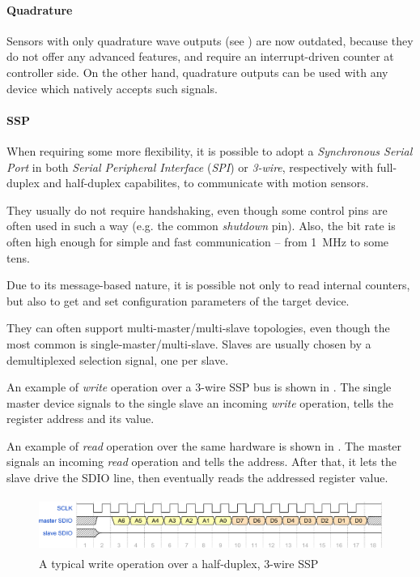 \documentclass[a4paper,10pt]{article}
\begin{document}
\begin{multicols}{2}
\paragraph{Quadrature}
Sensors with only quadrature wave outputs (see ) are now
outdated, because they do not offer any advanced features, and require an
interrupt-driven counter at controller side. On the other hand, quadrature
outputs can be used with any device which natively accepts such signals.


\paragraph{SSP}
When requiring some more flexibility, it is possible to adopt a
\emph{Synchronous Serial Port} in both \emph{Serial Peripheral Interface}
(\emph{SPI}) or \emph{3-wire}, respectively with full-duplex and half-duplex
capabilites, to communicate with motion sensors.

They usually do not require handshaking, even though some control pins are
often used in such a way (e.g. the common \emph{shutdown} pin). Also, the
bit rate is often high enough for simple and fast communication -- from
1~MHz to some tens.

Due to its message-based nature, it is possible not only to read internal
counters, but also to get and set configuration parameters of the target
device.

They can often support multi-master/multi-slave topologies, even though the
most common is single-master/multi-slave. Slaves are usually chosen by a
demultiplexed selection signal, one per slave.

An example of \emph{write} operation over a 3-wire SSP bus is shown in
. The single master device signals to the single slave
an incoming \emph{write} operation, tells the register address and its value.

An example of \emph{read} operation over the same hardware is shown in
. The master signals an incoming \emph{read} operation
and tells the address. After that, it lets the slave drive the SDIO line,
then eventually reads the addressed register value.

\begin{figure}[t]
	\centering
	\includegraphics[keepaspectratio=true,height=1.8cm]{images/ssp_write.pdf}
	\caption{A typical write operation over a half-duplex, 3-wire SSP}
	\label{fig:ssp_write}
\end{figure}


\end{multicols}
\end{document}
